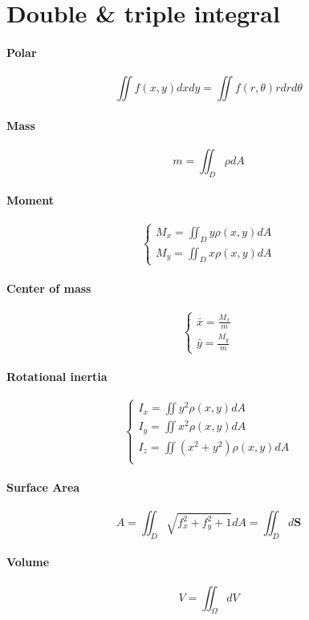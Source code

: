 \documentclass[12pt]{article}
\begin{document}
\section{Double \& triple integral}

\paragraph{Polar}
\[\iint f(x, y)dxdy = \iint f(r, \theta)rdrd\theta\]

\paragraph{Mass}
\[m = \iint_D \rho dA\]

\paragraph{Moment}
\[
	\begin{cases}
		M_x = \iint_D y\rho(x, y)dA\\
		M_y = \iint_D x\rho(x, y)dA
	\end{cases}
\]

\paragraph{Center of mass}
\[
	\begin{cases}
		\bar{x} = \frac{M_x}{m}\\
		\bar{y} = \frac{M_y}{m}
	\end{cases}
\]

\paragraph{Rotational inertia}
\[
	\begin{cases}
		I_x = \iint y^2 \rho(x, y)dA\\
		I_y = \iint x^2 \rho(x, y)dA\\
		I_z = \iint (x^2 + y^2) \rho(x, y)dA\\
	\end{cases}
\]

\paragraph{Surface Area}
\[A = \iint_D \sqrt{f_x^2 + f_y^2 + 1}dA = \iint_D d\mathbf{S}\]

\paragraph{Volume}
\[V = \iint_{\Omega} dV\]
\end{document}

